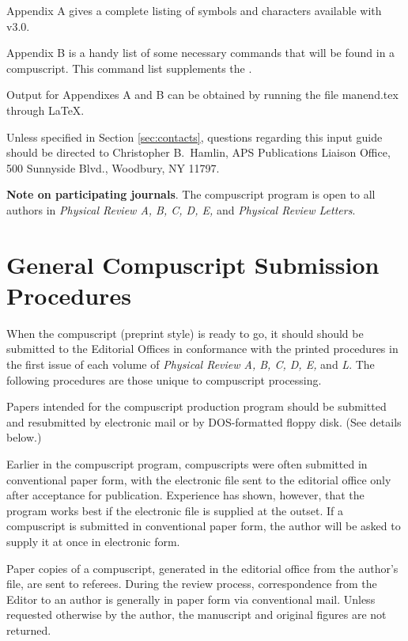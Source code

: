 Appendix A gives a complete listing of symbols and characters available
with \REVTeX{} v3.0.

Appendix B is a handy  list of some necessary commands that will be found
in a \REVTeX{} compuscript.  This command list supplements the \LUG{}.

Output for Appendixes A and B can be obtained by running the file
manend.tex through \LaTeX.

Unless specified in Section \ref{sec:contacts}, questions regarding this
input guide should be directed to Christopher B.\ Hamlin, APS Publications
Liaison Office, 500 Sunnyside Blvd., Woodbury, NY 11797.
%


{\bf Note on participating journals}.
The compuscript program is open to all authors in {\em Physical Review A,
B, C, D, E,} and {\em Physical Review Letters}.



\section{General Compuscript Submission Procedures}
\label{sec:gensubmit}

When the \REVTeX{} compuscript (preprint style) is ready to go, it should
should be submitted to the Editorial Offices in conformance with the
printed procedures in the first issue of each volume of {\em Physical
Review A, B, C, D, E,} and {\em L}. The following procedures are those
unique to compuscript processing.

Papers intended for the compuscript production program should be submitted
and resubmitted by electronic mail or by DOS-formatted floppy disk. (See
details below.)

Earlier in the compuscript program, compuscripts were often submitted in
conventional paper form, with the electronic file sent to the editorial
office only after acceptance for publication. Experience has shown,
however, that the program works best if the electronic file is supplied at
the outset. If a compuscript is submitted in conventional paper form, the
author will be asked to supply it at once in electronic form.

Paper copies of a compuscript, generated in the editorial office from the
author's file, are sent to referees. During the review process,
correspondence from the Editor to an author is generally in paper form via
conventional mail. Unless requested otherwise by the author, the manuscript
and original figures are not returned.

